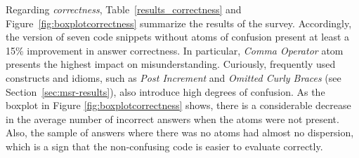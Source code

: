 Regarding \emph{correctness}, Table~\ref{results_correctness} and Figure~\ref{fig:boxplotcorrectness} summarize the results of the survey. Accordingly, the version of seven code snippets without atoms of confusion present at least a 15\% improvement in answer correctness. In particular, \emph{Comma Operator} atom presents the highest impact on misunderstanding. 
Curiously, frequently used constructs and idioms, such as \emph{Post Increment} and \emph{Omitted Curly Braces} (see Section~\ref{sec:msr-results}), also introduce high degrees of confusion. As the boxplot in Figure \ref{fig:boxplotcorrectness} shows, there is a considerable decrease in the average number of incorrect answers when the atoms were not present. Also, the sample of answers where there was no atoms had almost no dispersion, which is a sign that the non-confusing code is easier to evaluate correctly.


